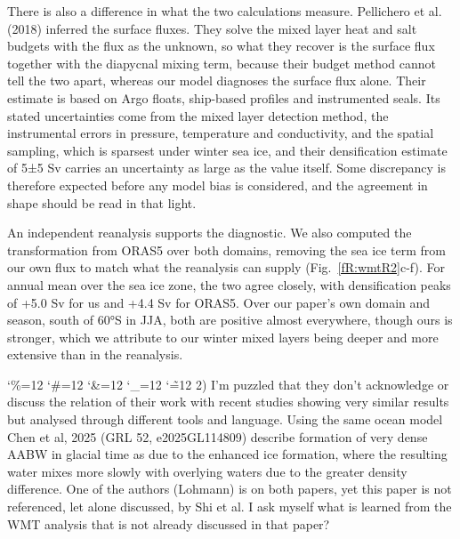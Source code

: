 \documentclass[11pt,a4paper]{article}
\newcommand{\comment}[1]{\par\medskip\noindent\color{black}\begingroup\catcode`\%=12 \catcode`\#=12 \catcode`\&=12 \catcode`\_=12 \catcode`\~=12 \commentbody}
\newcommand{\commentbody}[1]{#1\endgroup\par\smallskip}
\begin{document}
There is also a difference in what the two calculations measure. Pellichero et al. (2018) inferred the surface fluxes. They solve the mixed layer heat and salt budgets with the flux as the unknown, so what they recover is the surface flux together with the diapycnal mixing term, because their budget method cannot tell the two apart, whereas our model diagnoses the surface flux alone. Their estimate is based on Argo floats, ship-based profiles and instrumented seals. Its stated uncertainties come from the mixed layer detection method, the instrumental errors in pressure, temperature and conductivity, and the spatial sampling, which is sparsest under winter sea ice, and their densification estimate of 5±5 Sv carries an uncertainty as large as the value itself. Some discrepancy is therefore expected before any model bias is considered, and the agreement in shape should be read in that light. %


An independent reanalysis supports the diagnostic. We also computed the transformation from ORAS5 over both domains, removing the sea ice term from our own flux to match what the reanalysis can supply (Fig.~\ref{fR:wmtR2}c-f). For annual mean over the sea ice zone, the two agree closely, with densification peaks of +5.0 Sv for us and +4.4 Sv for ORAS5. Over our paper's own domain and season, south of 60°S in JJA, both are positive almost everywhere, though ours is stronger, which we attribute to our winter mixed layers being deeper and more extensive than in the reanalysis.

\comment{R2}{2) I'm puzzled that they don't acknowledge or discuss the relation of their work with recent studies showing very similar results but analysed through different tools and language. Using the same ocean model Chen et al, 2025 (GRL 52, e2025GL114809) describe formation of very dense AABW in glacial time as due to the enhanced ice formation, where the resulting water mixes more slowly with overlying waters due to the greater density difference. One of the authors (Lohmann) is on both papers, yet this paper is not referenced, let alone discussed, by Shi et al. I ask myself what is learned from the WMT analysis that is not already discussed in that paper?}
\end{document}
